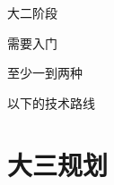 \documentclass{beamer}
\begin{document}
\begin{frame}
    \vfill %
    \begin{center}
        \Huge
        大二阶段
        
        \vspace{0.5cm} %
        
        \huge
        需要入门
        
        \vspace{0.5cm} %
        
        \LARGE
        \alert{至少一到两种}
        
        \vspace{0.5cm} %
        
        \huge
        以下的技术路线
    \end{center}
    \vfill
\end{frame}

\section{大三规划}
\end{document}
